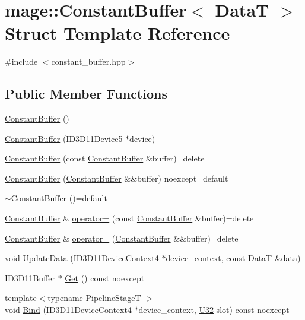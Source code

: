 \hypertarget{structmage_1_1_constant_buffer}{}\section{mage\+:\+:Constant\+Buffer$<$ DataT $>$ Struct Template Reference}
\label{structmage_1_1_constant_buffer}


{\ttfamily \#include $<$constant\+\_\+buffer.\+hpp$>$}

\subsection*{Public Member Functions}
\begin{DoxyCompactItemize}
\item 
\hyperlink{structmage_1_1_constant_buffer_a3badd88f8570d6622f6eb33c7420a87d}{Constant\+Buffer} ()
\item 
\hyperlink{structmage_1_1_constant_buffer_aaf32ac894aa2fe73bcbd9033e6e7efb0}{Constant\+Buffer} (I\+D3\+D11\+Device5 $\ast$device)
\item 
\hyperlink{structmage_1_1_constant_buffer_a67fe42cb52e63e38474b6c65341fbe82}{Constant\+Buffer} (const \hyperlink{structmage_1_1_constant_buffer}{Constant\+Buffer} \&buffer)=delete
\item 
\hyperlink{structmage_1_1_constant_buffer_aeb0642e0e405eeb18658c0962a52f406}{Constant\+Buffer} (\hyperlink{structmage_1_1_constant_buffer}{Constant\+Buffer} \&\&buffer) noexcept=default
\item 
\hyperlink{structmage_1_1_constant_buffer_a874e9507ea3b6d2f630f061c2fc6d2d0}{$\sim$\+Constant\+Buffer} ()=default
\item 
\hyperlink{structmage_1_1_constant_buffer}{Constant\+Buffer} \& \hyperlink{structmage_1_1_constant_buffer_acb1a4f4b656073609075b5e89dea6973}{operator=} (const \hyperlink{structmage_1_1_constant_buffer}{Constant\+Buffer} \&buffer)=delete
\item 
\hyperlink{structmage_1_1_constant_buffer}{Constant\+Buffer} \& \hyperlink{structmage_1_1_constant_buffer_ad050b1f0f03a5fcd2b51977a744781a3}{operator=} (\hyperlink{structmage_1_1_constant_buffer}{Constant\+Buffer} \&\&buffer)=delete
\item 
void \hyperlink{structmage_1_1_constant_buffer_aa9a12f5975b1b53b5b174e563d77aaf7}{Update\+Data} (I\+D3\+D11\+Device\+Context4 $\ast$device\+\_\+context, const DataT \&data)
\item 
I\+D3\+D11\+Buffer $\ast$ \hyperlink{structmage_1_1_constant_buffer_a6b8fcbd873ffbda96d7412c581d5a29a}{Get} () const noexcept
\item 
{\footnotesize template$<$typename Pipeline\+StageT $>$ }\\void \hyperlink{structmage_1_1_constant_buffer_a7592eed823334cdc3da614121f2b25ca}{Bind} (I\+D3\+D11\+Device\+Context4 $\ast$device\+\_\+context, \hyperlink{namespacemage_a41c104c036fba3756a74e19f793eeaa1}{U32} slot) const noexcept
\end{DoxyCompactItemize}
